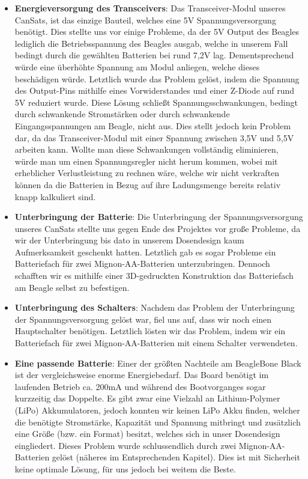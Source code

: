 \begin{itemize}
\item \textbf{Energieversorgung des Transceivers}: Das Transceiver-Modul unseres CanSats, ist das einzige Bauteil, welches eine 5V Spannungsversorgung benötigt. Dies stellte uns vor einige Probleme, da der 5V Output des Beagles lediglich die Betriebsspannung des Beagles ausgab, welche in unserem Fall bedingt durch die gewählten Batterien bei rund 7,2V lag. Dementsprechend würde eine überhöhte Spannung am Modul anliegen, welche dieses beschädigen würde. Letztlich wurde das Problem gelöst, indem die Spannung des Output-Pins mithilfe eines Vorwiderstandes und einer Z-Diode auf rund 5V reduziert wurde. Diese Lösung schließt Spannungsschwankungen, bedingt durch schwankende Stromstärken oder durch schwankende Eingangsspannungen am Beagle, nicht aus. Dies stellt jedoch kein Problem dar, da das Transceiver-Modul mit einer Spannung zwischen 3,5V und 5,5V arbeiten kann. Wollte man diese Schwankungen vollständig eliminieren, würde man um einen Spannungsregler nicht herum kommen, wobei mit erheblicher Verlustleistung zu rechnen wäre, welche wir nicht verkraften können da die Batterien in Bezug auf ihre Ladungsmenge bereits relativ knapp kalkuliert sind. 
\item \textbf{Unterbringung der Batterie}: Die Unterbringung der Spannungsversorgung unseres CanSats stellte uns gegen Ende des Projektes vor große Probleme, da wir der Unterbringung bis dato in unserem Dosendesign kaum Aufmerksamkeit geschenkt hatten. Letztlich gab es sogar Probleme ein Batteriefach für zwei Mignon-AA-Batterien unterzubringen. Dennoch schafften wir es mithilfe einer 3D-gedruckten Konstruktion das Batteriefach am Beagle selbst zu befestigen.
\item \textbf{Unterbringung des Schalters}: Nachdem das Problem der Unterbringung der Spannungsversorgung gelöst war, fiel uns auf, dass wir noch einen Hauptschalter benötigen. Letztlich lösten wir das Problem, indem wir ein Batteriefach für zwei Mignon-AA-Batterien mit einem Schalter verwendeten.
\item \textbf{Eine passende Batterie}: Einer der größten Nachteile am BeagleBone Black ist der vergleichsweise enorme Energiebedarf. Das Board benötigt im laufenden Betrieb ca. 200mA und während des Bootvorganges sogar kurzzeitig das Doppelte. Es gibt zwar eine Vielzahl an Lithium-Polymer (LiPo) Akkumulatoren, jedoch konnten wir keinen LiPo Akku finden, welcher die benötigte Stromstärke, Kapazität und Spannung mitbringt und zusätzlich eine Größe (bzw. ein Format) besitzt, welches sich in unser Dosendesign eingliedert. Dieses Problem wurde schlussendlich durch zwei Mignon-AA- Batterien gelöst (näheres im Entsprechenden Kapitel). Dies ist mit Sicherheit keine optimale Lösung, für uns jedoch bei weitem die Beste.

\end{itemize}
